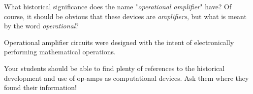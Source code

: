 

What historical significance does the name "{\it operational amplifier}" have?  Of course, it should be obvious that these devices are {\it amplifiers}, but what is meant by the word {\it operational}?







Operational amplifier circuits were designed with the intent of electronically performing mathematical operations.







Your students should be able to find plenty of references to the historical development and use of op-amps as computational devices.  Ask them where they found their information!





